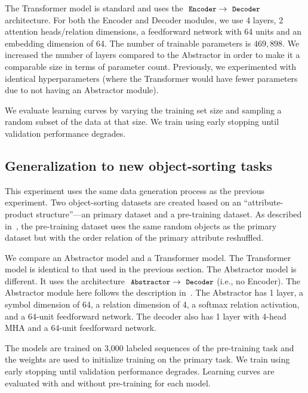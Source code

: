 The Transformer model is standard and uses the $\module{Encoder} \to \module{Decoder}$ architecture. For both the Encoder and Decoder modules, we use 4 layers, 2 attention heads/relation dimensions, a feedforward network with 64 units and an embedding dimension of 64. The number of trainable parameters is $469,898$. We increased the number of layers compared to the Abstractor in order to make it a comparable size in terms of parameter count. Previously, we experimented with identical hyperparameters (where the Transformer would have fewer parameters due to not having an Abstractor module).

We evaluate learning curves by varying the training set size and sampling a random subset of the data at that size. We train using early stopping until validation performance degrades.

\subsection{Generalization to new object-sorting tasks}\label{ssec:supp_exp_object_sorting_generalization}
This experiment uses the same data generation process as the previous experiment. Two object-sorting datasets are created based on an ``attribute-product structure''---an primary dataset and a pre-training dataset. As described in~, the pre-training dataset uses the same random objects as the primary dataset but with the order relation of the primary attribute reshuffled.

We compare an Abstractor model and a Transformer model. The Transformer model is identical to that used in the previous section. The Abstractor model is different. It uses the architecture $\module{Abstractor} \to \module{Decoder}$ (i.e., no Encoder). The Abstractor module here follows the description in~. The Abstractor has 1 layer, a symbol dimension of 64, a relation dimension of 4, a softmax relation activation, and a 64-unit feedforward network. The decoder also has 1 layer with 4-head MHA and a 64-unit feedforward network.

The models are trained on 3,000 labeled sequences of the pre-training task and the weights are used to initialize training on the primary task. We train using early stopping until validation performance degrades. Learning curves are evaluated with and without pre-training for each model.

